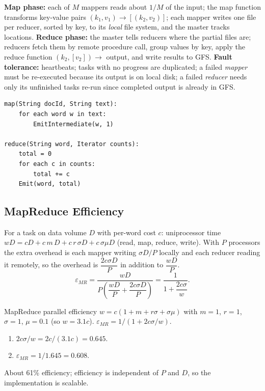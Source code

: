 \textbf{Map phase:} each of $M$ mappers reads about $1/M$ of the input; the map function transforms key-value pairs
$(k_1,v_1)\to[(k_2,v_2)]$; each mapper writes one file per reducer, sorted by key, to its \emph{local} file system, and the master tracks
locations. \textbf{Reduce phase:} the master tells reducers where the partial files are; reducers fetch them by remote procedure call,
group values by key, apply the reduce function $(k_2,[v_2])\to$ output, and write results to GFS.
\textbf{Fault tolerance:} heartbeats; tasks with no progress are duplicated; a failed \emph{mapper} must be re-executed because its output
is on local disk; a failed \emph{reducer} needs only its unfinished tasks re-run since completed output is already in GFS.

\begin{lstlisting}
map(String docId, String text):
    for each word w in text:
        EmitIntermediate(w, 1)

reduce(String word, Iterator counts):
    total = 0
    for each c in counts:
        total += c
    Emit(word, total)
\end{lstlisting}

\subsection{MapReduce Efficiency}
For a task on data volume $D$ with per-word cost $c$: uniprocessor time
$wD = cD + c\,m\,D + c\,r\,\sigma D + c\,\sigma\mu D$ (read, map, reduce, write). With $P$ processors the extra overhead is each mapper writing
$\sigma D/P$ locally and each reducer reading it remotely, so the overhead is $\dfrac{2c\sigma D}{P}$ in addition to $\dfrac{wD}{P}$.
\[ \varepsilon_{MR} = \frac{wD}{P\left(\dfrac{wD}{P} + \dfrac{2c\sigma D}{P}\right)} = \frac{1}{1 + \dfrac{2c\sigma}{w}}. \]

\begin{solved}{MapReduce parallel efficiency}
\Given $w = c(1 + m + r\sigma + \sigma\mu)$ with $m = 1$, $r = 1$, $\sigma = 1$, $\mu = 0.1$ (so $w = 3.1c$).
\Formula $\varepsilon_{MR} = 1/(1 + 2c\sigma/w)$.
\Steps
\begin{enumerate}[leftmargin=*]
  \item $2c\sigma/w = 2c/(3.1c) = 0.645$.
  \item $\varepsilon_{MR} = 1/1.645 = 0.608$.
\end{enumerate}
\Answer About 61\% efficiency; efficiency is independent of $P$ and $D$, so the implementation is scalable.
\end{solved}

